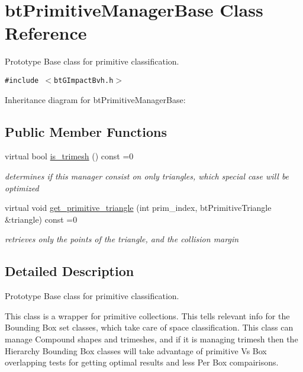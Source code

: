 \hypertarget{classbt_primitive_manager_base}{
\section{btPrimitiveManagerBase Class Reference}
\label{classbt_primitive_manager_base}
}
Prototype Base class for primitive classification.  


{\tt \#include $<$btGImpactBvh.h$>$}

Inheritance diagram for btPrimitiveManagerBase:\subsection*{Public Member Functions}
\begin{CompactItemize}
\item 
\hypertarget{classbt_primitive_manager_base_7dce7dd350286219d9adddefa20394f9}{
virtual bool \hyperlink{classbt_primitive_manager_base_7dce7dd350286219d9adddefa20394f9}{is\_\-trimesh} () const =0}
\label{classbt_primitive_manager_base_7dce7dd350286219d9adddefa20394f9}

\begin{CompactList}\small\item\em determines if this manager consist on only triangles, which special case will be optimized \item\end{CompactList}\item 
\hypertarget{classbt_primitive_manager_base_2eb95b960e4259da38c5ee4ac080fdf7}{
virtual void \hyperlink{classbt_primitive_manager_base_2eb95b960e4259da38c5ee4ac080fdf7}{get\_\-primitive\_\-triangle} (int prim\_\-index, btPrimitiveTriangle \&triangle) const =0}
\label{classbt_primitive_manager_base_2eb95b960e4259da38c5ee4ac080fdf7}

\begin{CompactList}\small\item\em retrieves only the points of the triangle, and the collision margin \item\end{CompactList}\end{CompactItemize}


\subsection{Detailed Description}
Prototype Base class for primitive classification. 

This class is a wrapper for primitive collections. This tells relevant info for the Bounding Box set classes, which take care of space classification. This class can manage Compound shapes and trimeshes, and if it is managing trimesh then the Hierarchy Bounding Box classes will take advantage of primitive Vs Box overlapping tests for getting optimal results and less Per Box compairisons. 

